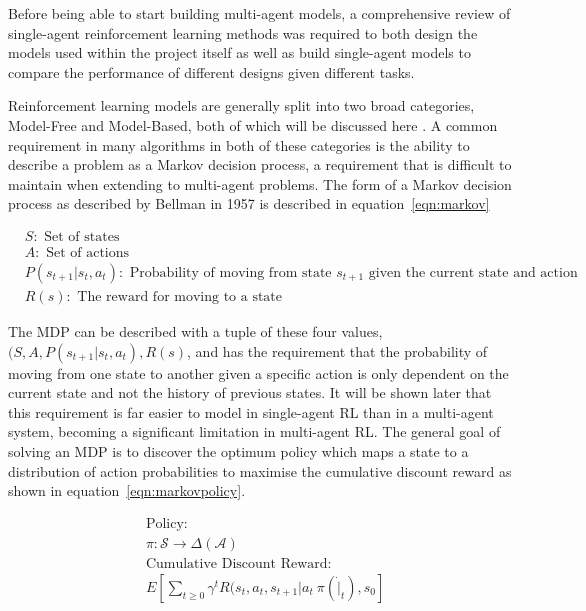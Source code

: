 \documentclass{article}
\begin{document}
Before being able to start building multi-agent models, a comprehensive review of single-agent reinforcement learning methods was required to both design the models used within the project itself as well as build single-agent models to compare the performance of different designs given different tasks.

Reinforcement learning models are generally split into two broad categories, Model-Free and Model-Based, both of which will be discussed here \cite{Huang2020Model-basedLearning}. A common requirement in many algorithms in both of these categories is the ability to describe a problem as a Markov decision process, a requirement that is difficult to maintain when extending to multi-agent problems. The form of a Markov decision process as described by Bellman in 1957\cite{RichardBellman1957AProcess} is described in equation~\ref{eqn:markov} 

\begin{subequations}\label{eqn:markov}
\begin{align}
    & S: \text{ Set of states} \\
    & A: \text{ Set of actions} \\
    & P(s_{t+1} | s_t, a_t): \text{ Probability of moving from state } s_{t+1} \text{ given the current state and action} \\
    & R(s): \text{ The reward for moving to a state}
\end{align}
\end{subequations}

The MDP can be described with a tuple of these four values, $(S, A, P(s_{t+1} | s_t, a_t), R(s)$, and has the requirement that the probability of moving from one state to another given a specific action is only dependent on the current state and not the history of previous states. It will be shown later that this requirement is far easier to model in single-agent RL than in a multi-agent system, becoming a significant limitation in multi-agent RL. The general goal of solving an MDP is to discover the optimum policy which maps a state to a distribution of action probabilities to maximise the cumulative discount reward as shown in equation~\ref{eqn:markovpolicy}.

\begin{subequations}\label{eqn:markovpolicy}
\begin{align}
    & \text{Policy:} \\
    & \pi : \mathcal{S} \rightarrow \Delta(\mathcal{A}) \\
    & \text{Cumulative Discount Reward:} \\
    & E[\sum_{t \ge 0} \gamma^t R(s_t, a_t, s_{t+1} | a_t ~ \pi(\dot | _t), s_0]
\end{align}
\end{subequations}
\end{document}
